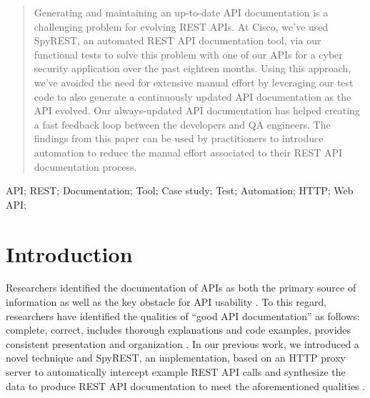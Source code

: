 \documentclass[10pt, conference]{IEEEtran}
\begin{document}




\maketitle


\begin{abstract}
Generating and maintaining an up-to-date API documentation is a challenging problem for evolving REST APIs. At Cisco, we've used SpyREST, an automated REST API documentation tool, via our functional tests to solve this problem with one of our APIs for a cyber security application over the past eighteen months. Using this approach, we've avoided the need for extensive manual effort by leveraging our test code to also generate a continuously updated API documentation as the API evolved. Our always-updated API documentation has helped creating a fast feedback loop between the developers and QA engineers. The findings from this paper can be used by practitioners to introduce automation to reduce the manual effort associated to their REST API documentation process.

\end{abstract}

\begin{IEEEkeywords}
API; REST; Documentation; Tool; Case study; Test; Automation; HTTP; Web API;

\end{IEEEkeywords}


%
\IEEEpeerreviewmaketitle

\section{Introduction}

Researchers identified the documentation of APIs as both the primary source of information as well as the key obstacle for API usability \cite{Robillard_what_makes}. To this regard, researchers have identified the qualities of ``good API documentation'' as follows: complete, correct, includes thorough explanations and code examples, provides consistent presentation and organization \cite{Robillard_what_makes,Myers_study}. In our previous work, we introduced a novel technique and SpyREST, an implementation, based on an HTTP proxy server to automatically intercept example REST API calls and synthesize the data to produce REST API documentation to meet the aforementioned qualities \cite{DBLP:conf/kbse/SohanAM15}.
\end{document}
